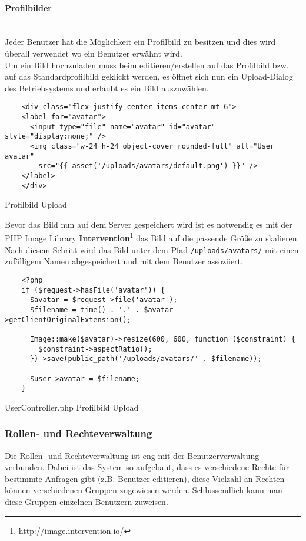 \paragraph{Profilbilder}\mbox{}\\
Jeder Benutzer hat die Möglichkeit ein Profilbild zu besitzen und dies wird
überall verwendet wo ein Benutzer erwähnt wird.\\

Um ein Bild hochzuladen muss beim editieren/erstellen auf das Profilbild bzw.
auf das Standardprofilbild geklickt werden, es öffnet sich nun ein Upload-Dialog
des Betriebsystems und erlaubt es ein Bild auszuwählen.

\begin{listing}[H]
  \begin{verbatim}
    <div class="flex justify-center items-center mt-6">
    <label for="avatar">
      <input type="file" name="avatar" id="avatar" style="display:none;" />
      <img class="w-24 h-24 object-cover rounded-full" alt="User avatar"
        src="{{ asset('/uploads/avatars/default.png') }}" />
    </label>
    </div>
  \end{verbatim}
  \caption{Profilbild Upload}
\end{listing}

Bevor das Bild nun auf dem Server gespeichert wird ist es notwendig es mit der
PHP Image Library
\textbf{Intervention}\footnote{\url{http://image.intervention.io/}} das Bild auf
die passende Größe zu skalieren. Nach diesem Schritt wird das Bild unter dem
Pfad \verb|/uploads/avatars/| mit einem zufälligem Namen abgespeichert und mit
dem Benutzer assoziiert.

\begin{listing}[H]
  \begin{verbatim}
    <?php
    if ($request->hasFile('avatar')) {
      $avatar = $request->file('avatar');
      $filename = time() . '.' . $avatar->getClientOriginalExtension();

      Image::make($avatar)->resize(600, 600, function ($constraint) {
        $constraint->aspectRatio();
      })->save(public_path('/uploads/avatars/' . $filename));

      $user->avatar = $filename;
    }
  \end{verbatim}
  \caption{UserController.php Profilbild Upload}
\end{listing}

\subsubsection{Rollen- und Rechteverwaltung}
Die Rollen- und Rechteverwaltung ist eng mit der Benutzerverwaltung verbunden.
Dabei ist das System so aufgebaut, dass es verschiedene Rechte für bestimmte
Anfragen gibt (z.B. Benutzer editieren), diese Vielzahl an Rechten können
verschiedenen Gruppen zugewiesen werden. Schlussendlich kann man diese Gruppen
einzelnen Benutzern zuweisen.\\

